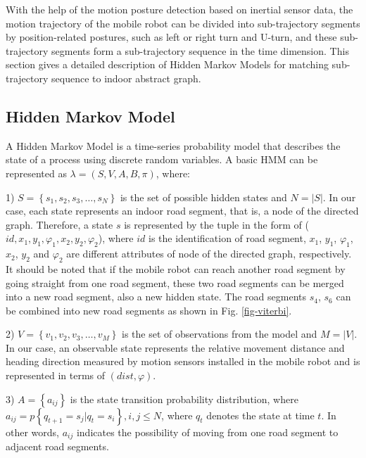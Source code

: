 \documentclass{llncs}
\begin{document}
With the help of the motion posture detection based on inertial sensor data, the motion trajectory of the mobile robot can be divided into sub-trajectory segments by position-related postures, such as left or right turn and U-turn, and these sub-trajectory segments form a sub-trajectory sequence in the time dimension. This section gives a detailed description of Hidden Markov Models for matching sub-trajectory sequence to indoor abstract graph.

\subsection{Hidden Markov Model}

A Hidden Markov Model is a time-series probability model that describes the state of a process using discrete random variables. A basic HMM can be represented as $\lambda  = (S,V,A,B,\pi)$, where:

1) $S = \left\{ {{s_1},{s_2},{s_3}, \ldots ,{s_N}} \right\}$ is the set of possible hidden states and $N = \left| S \right|$. In our case, each state represents an indoor road segment, that is, a node of the directed graph. Therefore, a state $s$ is represented by the tuple in the form of ($id,x_{1},y_{1},{\varphi}_{1},x_{2},y_{2},{\varphi}_{2}$), where $id$ is the identification of road segment, $x_{1}$, $y_{1}$, ${\varphi}_{1}$, $x_{2}$, $y_{2}$ and ${\varphi}_{2}$ are different attributes of node of the directed graph, respectively. It should be noted that if the mobile robot can reach another road segment by going straight from one road segment, these two road segments can be merged into a new road segment, also a new hidden state. The road segments $s_4$, $s_6$ can be combined into new road segments as shown in Fig. \ref{fig-viterbi}.

2) $V = \left\{ {{v_1},{v_2},{v_3}, \ldots ,{v_M}} \right\}$ is the set of observations from the model and $M = \left| V \right|$. In our case, an observable state represents the relative movement distance and heading direction measured by motion sensors installed in the mobile robot and is represented in terms of $(dist,\varphi)$.

3) $A = \left\{ {{a_{ij}}} \right\}$ is the state transition probability distribution, where \\ ${a_{ij}} = p\left\{ {{q_{t + 1}} = {s_j}|{q_t} = {s_i}} \right\}, i, j \le N$, where ${q_t}$ denotes the state at time $t$. In other words, $a_{ij}$ indicates the possibility of moving from one road segment to adjacent road segments.
\end{document}
